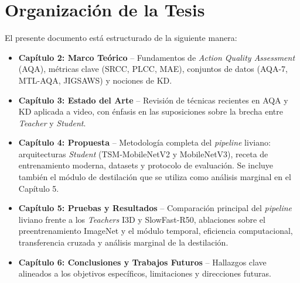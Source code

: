 \section{Organización de la Tesis}
\label{sec:organizacion}

El presente documento está estructurado de la siguiente manera:

\begin{itemize}
    \item \textbf{Capítulo 2: Marco Teórico} -- Fundamentos de \textit{Action Quality Assessment} (\ac{AQA}), métricas clave (\ac{SRCC}, \ac{PLCC}, \ac{MAE}), conjuntos de datos (AQA-7, MTL-AQA, JIGSAWS) y nociones de \ac{KD}.

    \item \textbf{Capítulo 3: Estado del Arte} -- Revisión de técnicas recientes en \ac{AQA} y \ac{KD} aplicada a video, con énfasis en las suposiciones sobre la brecha entre \textit{Teacher} y \textit{Student}.

    \item \textbf{Capítulo 4: Propuesta} -- Metodología completa del \textit{pipeline} liviano: arquitecturas \textit{Student} (\ac{TSM}-MobileNetV2 y MobileNetV3), receta de entrenamiento moderna, datasets y protocolo de evaluación. Se incluye también el módulo de destilación que se utiliza como análisis marginal en el Capítulo 5.

    \item \textbf{Capítulo 5: Pruebas y Resultados} -- Comparación principal del \textit{pipeline} liviano frente a los \textit{Teachers} \ac{I3D} y SlowFast-R50, ablaciones sobre el preentrenamiento ImageNet y el módulo temporal, eficiencia computacional, transferencia cruzada y análisis marginal de la destilación.

    \item \textbf{Capítulo 6: Conclusiones y Trabajos Futuros} -- Hallazgos clave alineados a los objetivos específicos, limitaciones y direcciones futuras.
\end{itemize}
